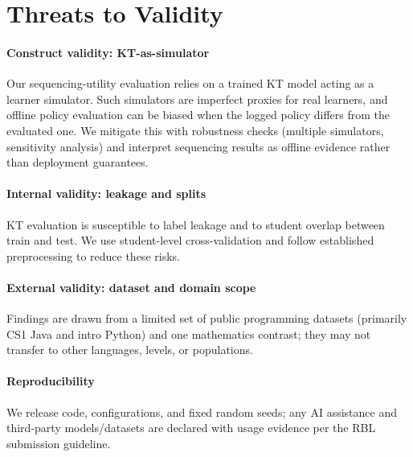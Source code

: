 \section{Threats to Validity}
\label{sec:threats}

\paragraph{Construct validity: KT-as-simulator}
Our sequencing-utility evaluation relies on a trained KT model acting as
a learner simulator. Such simulators are imperfect proxies for real
learners, and offline policy evaluation can be biased when the logged
policy differs from the evaluated one. We mitigate this with robustness
checks (multiple simulators, sensitivity analysis) and interpret
sequencing results as offline evidence rather than deployment guarantees.

\paragraph{Internal validity: leakage and splits}
KT evaluation is susceptible to label leakage and to student overlap
between train and test. We use student-level cross-validation and follow
established preprocessing to reduce these risks.

\paragraph{External validity: dataset and domain scope}
Findings are drawn from a limited set of public programming datasets
(primarily CS1 Java and intro Python) and one mathematics contrast; they
may not transfer to other languages, levels, or populations.

\paragraph{Reproducibility}
We release code, configurations, and fixed random seeds; any AI
assistance and third-party models/datasets are declared with usage
evidence per the RBL submission guideline.
